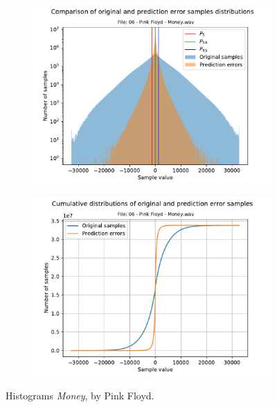 \begin{figure}[h!]
	\centering
	\begin{subfigure}{0.45\textwidth}
		\centering
		\includegraphics[width=\linewidth]{images/wave_hists/06 - Pink Floyd - Money.wav_hist.pdf}
	\end{subfigure}%
	\begin{subfigure}{0.45\textwidth}
		\centering
		\includegraphics[width=\linewidth]{images/wave_hists/06 - Pink Floyd - Money.wav_hist_cum.pdf}
	\end{subfigure}
	\caption{Histograms \textit{Money}, by Pink Floyd.}
	\label{fig:money_pink_floyd}
\end{figure}